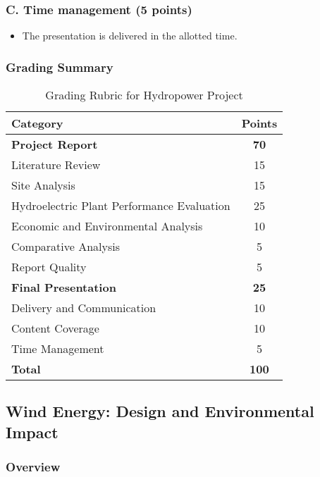\documentclass[11pt]{article}
\begin{document}
\subsubsection*{C. Time management (5 points)}
\begin{itemize}
    \item The presentation is delivered in the allotted time.
\end{itemize}

\subsubsection*{Grading Summary}
\begin{table}[h!]
    \centering
    \begin{tabular}{|l|c|}
        \hline
        \textbf{Category} & \textbf{Points} \\
        \hline
        \textbf{Project Report} & \textbf{70} \\
        Literature Review & 15 \\
        Site Analysis & 15 \\
        Hydroelectric Plant Performance Evaluation& 25 \\
        Economic and Environmental Analysis & 10 \\
        Comparative Analysis & 5 \\
        Report Quality & 5 \\
        \hline
        \textbf{Final Presentation} & \textbf{25} \\
        Delivery and Communication & 10 \\
        Content Coverage & 10 \\
        Time Management & 5 \\
        \hline
        \textbf{Total} & \textbf{100} \\
        \hline
    \end{tabular}
    \caption{Grading Rubric for Hydropower Project}
\end{table}
\newpage 

\subsection{Wind Energy: Design and Environmental Impact}

\subsubsection*{Overview}
\end{document}
